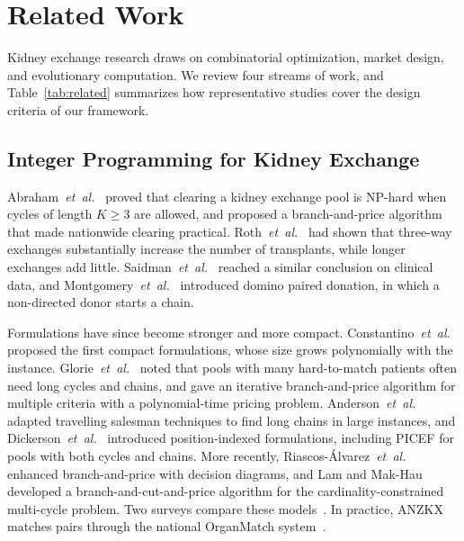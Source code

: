 \documentclass[journal]{IEEEtran}
\begin{document}
\section{Related Work}
\label{sec:related}

Kidney exchange research draws on combinatorial optimization, market
design, and evolutionary computation.
We review four streams of work, and Table~\ref{tab:related} summarizes
how representative studies cover the design criteria of our framework.

\subsection{Integer Programming for Kidney Exchange}
\label{sec:related:ilp}

Abraham~\textit{et~al.}~\cite{abraham2007clearing} proved that clearing
a kidney exchange pool is NP-hard when cycles of length $K \geq 3$ are
allowed, and proposed a branch-and-price algorithm that made nationwide
clearing practical.
Roth~\textit{et~al.}~\cite{roth2007efficient} had shown that three-way
exchanges substantially increase the number of transplants, while
longer exchanges add little.
Saidman~\textit{et~al.}~\cite{saidman2006increasing} reached a similar
conclusion on clinical data, and
Montgomery~\textit{et~al.}~\cite{montgomery2006domino} introduced domino
paired donation, in which a non-directed donor starts a chain.

Formulations have since become stronger and more compact.
Constantino~\textit{et~al.}~\cite{constantino2013new} proposed the first
compact formulations, whose size grows polynomially with the instance.
Glorie~\textit{et~al.}~\cite{glorie2014kidney} noted that pools with many
hard-to-match patients often need long cycles and chains, and gave an
iterative branch-and-price algorithm for multiple criteria with a
polynomial-time pricing problem.
Anderson~\textit{et~al.}~\cite{anderson2015new} adapted travelling
salesman techniques to find long chains in large instances, and
Dickerson~\textit{et~al.}~\cite{dickerson2016picef} introduced
position-indexed formulations, including PICEF for pools with both
cycles and chains.
More recently, Riascos-\'{A}lvarez~\textit{et~al.}~\cite{riascos2023branch}
enhanced branch-and-price with decision diagrams, and Lam and
Mak-Hau~\cite{lam2020branch} developed a branch-and-cut-and-price
algorithm for the cardinality-constrained multi-cycle problem.
Two surveys compare these models~\cite{barkel2026operational,biro2021modelling}.
In practice, ANZKX matches pairs through the national OrganMatch
system~\cite{anzkxprotocol2021}.
\end{document}
